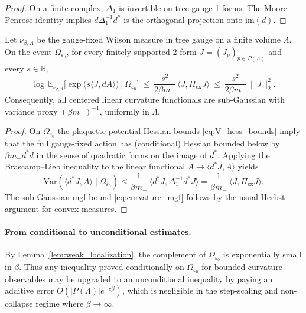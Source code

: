 \begin{proof}
On a finite complex, $\Delta_1$ is invertible on tree-gauge 1-forms. The Moore--Penrose identity implies
$d\Delta_1^{-1}d^*$ is the orthogonal projection onto $\mathrm{im}(d)$.
\end{proof}

\begin{proposition}\label{prop:curvature_BL}
Let $\nu_{\beta,\Lambda}$ be the gauge-fixed Wilson measure in tree gauge on a finite volume $\Lambda$.
On the event $\Omega_{\varepsilon_0}$, for every finitely supported 2-form $J=(J_p)_{p\in P(\Lambda)}$ and every $s\in\mathbb R$,
\begin{equation}\label{eq:curvature_mgf}
\log\,\mathbb E_{\nu_{\beta,\Lambda}}\Big[\exp\big(s\langle J, dA\rangle\big)\ \big|\ \Omega_{\varepsilon_0}\Big]
\ \le\ \frac{s^2}{2\beta m_-}\,\langle J,\Pi_{\mathrm{ex}}J\rangle
\ \le\ \frac{s^2}{2\beta m_-}\,\|J\|_2^2.
\end{equation}
Consequently, all centered linear curvature functionals are sub-Gaussian with variance proxy $(\beta m_-)^{-1}$,
uniformly in $\Lambda$.
\end{proposition}

\begin{proof}
On $\Omega_{\varepsilon_0}$ the plaquette potential Hessian bounds \eqref{eq:V_hess_bounds} imply that the full gauge-fixed action
has (conditional) Hessian bounded below by $\beta m_- d^*d$ in the sense of quadratic forms on the image of $d^*$.
Applying the Brascamp--Lieb inequality to the linear functional $A\mapsto\langle d^*J, A\rangle$ yields
\[\mathrm{Var}(\langle d^*J, A\rangle\mid\Omega_{\varepsilon_0})\le \frac{1}{\beta m_-}\,\langle d^*J,\Delta_1^{-1} d^*J\rangle
=\frac{1}{\beta m_-}\,\langle J,\Pi_{\mathrm{ex}}J\rangle.\]
The sub-Gaussian mgf bound \eqref{eq:curvature_mgf} follows by the usual Herbst argument for convex measures.
\end{proof}

\paragraph{From conditional to unconditional estimates.}
By Lemma~\ref{lem:weak_localization}, the complement of $\Omega_{\varepsilon_0}$ is exponentially small in $\beta$.
Thus any inequality proved conditionally on $\Omega_{\varepsilon_0}$ for bounded curvature observables may be upgraded to an
unconditional inequality by paying an additive error $O(|P(\Lambda)|e^{-c\beta})$, which is negligible in the step-scaling and
non-collapse regime where $\beta\to\infty$.


